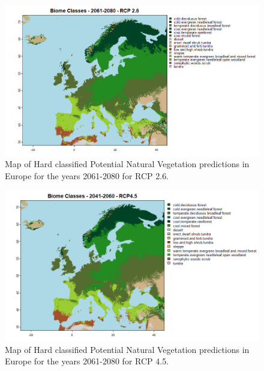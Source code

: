 \documentclass[
]{krantz}
\begin{document}
\begin{figure}

{\centering \includegraphics[width=1\linewidth]{work/05-naturalveg/figures/eu_pred_26_2c} 

}

\caption{Map of Hard classified Potential Natural Vegetation  predictions in Europe for the years 2061-2080 for RCP 2.6.}\label{fig:map26}
\end{figure}

\begin{figure}

{\centering \includegraphics[width=1\linewidth]{work/05-naturalveg/figures/eu_pred_45_2c} 

}

\caption{Map of Hard classified Potential Natural Vegetation  predictions in Europe for the years 2061-2080 for RCP 4.5.}\label{fig:map45}
\end{figure}
\end{document}
